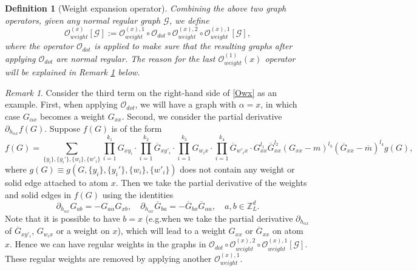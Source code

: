 \documentclass{article}
\newcommand{\1}{\mathds{1}}
\numberwithin{equation}{section}
\newcommand{\al}{\alpha}
\newcommand{\be}{\begin{equation}}
\newcommand{\ee}{\end{equation}}
\renewcommand{\cal}{\mathcal}
\newcommand{\Z}{\mathbb{Z}}
\theoremstyle{plain} %
\newtheorem{definition}[theorem]{Definition}
\theoremstyle{remark}
\newtheorem{remark}[theorem]{Remark}
\newcommand{\cor}{\color{red}}
\newcommand{\cob}{\color{purple}}
\newcommand{\hty}[1]{{\cor (ht: #1) }}
\begin{document}
\begin{definition} [Weight expansion operator]
Combining the above two graph operators, given any normal regular graph $\cal G$, we define
\be\label{eq defOdot}
{\cal O}_{weight}^{(x)}[ \cal G]:={\cal O}^{(x),1}_{weight} \circ\cal O_{dot} \circ  {\cal O}^{(x),2}_{weight} \circ {\cal O}^{(x),1}_{weight}  [\cal G], \ee
where the operator $\cal O_{dot}$ is applied to make sure that the resulting graphs after applying $\cal O_{dot}$ are normal regular.  The reason for the last  ${\cal O}^{(1)}_{weight}(x)$ operator will be explained in Remark \ref{remark remove_reg} below.

\end{definition}




\begin{remark}\label{remark remove_reg}
Consider the third term on the right-hand side of \eqref{Owx} as an example. First, when applying $\cal O_{dot}$, we will have a graph with $\al=x$, in which case $G_{\al x}$ becomes a weight $G_{xx}$. Second, we consider the partial derivative $\partial_{ h_{  \al x}} f(G) $.  Suppose $f(G)$ is of the form
$$f(G)=\sum_{\{y_i\},\{y_i'\},\{w_i\},\{w'_i\}} \prod_{i=1}^{k_1}G_{x y_i}  \cdot  \prod_{i=1}^{k_2}\overline G_{x y'_i} \cdot \prod_{i=1}^{k_3} G_{ w_i x} \cdot \prod_{i=1}^{k_4}\overline G_{ w'_i x} \cdot G_{xx}^{l_1} \overline G_{xx}^{l_2}(G_{xx}-m)^{l_3} (\overline G_{xx}-\overline m)^{l_4}  g(G),$$
where $ g(G)\equiv g (G,\{y_i\},\{y_i'\},\{w_i\},\{w'_i\})$ does not contain any weight or solid edge attached to atom $x$. Then we take the partial derivative of the weights and solid edges in $f(G)$ using the identities
\be\label{partialhG} \partial_{ h_{\al x}} G_{ab} = -G_{a\al}G_{xb}, \quad \partial_{ h_{\al x}} \overline G_{ba} =- \overline G_{bx}\overline G_{\al a},\quad a,b\in \Z_L^d.\ee
Note that it is possible to have $b=x$ (e.g.\;when we take the partial derivative $\partial_{ h_{\al x}}$ of $\overline G_{x y'_i} $, $G_{ w_i x}$ or a weight on $x$), which will lead to a weight $G_{xx}$ or $\overline G_{xx}$ on atom $x$.  Hence we can have regular weights in the graphs in $\cal O_{dot} \circ  {\cal O}^{(x),2}_{weight} \circ {\cal O}^{(x),1}_{weight}  [\cal G]$. These regular weights are  removed  by applying another ${\cal O}^{(x),1}_{weight} $.
\end{remark}
\end{document}
